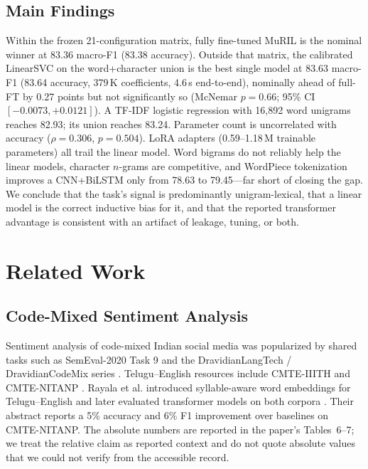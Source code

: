 \documentclass[10pt,journal]{IEEEtran}
\begin{document}
\subsection{Main Findings}
Within the frozen 21-configuration matrix, fully fine-tuned MuRIL is the nominal winner at 83.36 macro-F1 (83.38 accuracy). Outside that matrix, the calibrated LinearSVC on the word+character union is the best single model at 83.63 macro-F1 (83.64 accuracy, 379\,K coefficients, 4.6\,s end-to-end), nominally ahead of full-FT by 0.27 points but not significantly so (McNemar $p=0.66$; 95\% CI $[-0.0073,+0.0121]$). A TF-IDF logistic regression with 16{,}892 word unigrams reaches 82.93; its union reaches 83.24. Parameter count is uncorrelated with accuracy ($\rho=0.306$, $p=0.504$). LoRA adapters (0.59--1.18\,M trainable parameters) all trail the linear model. Word bigrams do not reliably help the linear models, character $n$-grams are competitive, and WordPiece tokenization improves a CNN+BiLSTM only from 78.63 to 79.45---far short of closing the gap. We conclude that the task's signal is predominantly unigram-lexical, that a linear model is the correct inductive bias for it, and that the reported transformer advantage is consistent with an artifact of leakage, tuning, or both.

\section{Related Work}
\subsection{Code-Mixed Sentiment Analysis}
Sentiment analysis of code-mixed Indian social media was popularized by shared tasks such as SemEval-2020 Task 9 \cite{patwa2020} and the DravidianLangTech / DravidianCodeMix series \cite{chakravarthi2022}. Telugu--English resources include CMTE-IIITH \cite{kusampudi2021} and CMTE-NITANP \cite{rayala2026}. Rayala et al. introduced syllable-aware word embeddings for Telugu--English \cite{rayala2023} and later evaluated transformer models on both corpora \cite{rayala2026}. Their abstract reports a 5\% accuracy and 6\% F1 improvement over baselines on CMTE-NITANP. The absolute numbers are reported in the paper's Tables~6--7; we treat the relative claim as reported context and do not quote absolute values that we could not verify from the accessible record.
\end{document}
